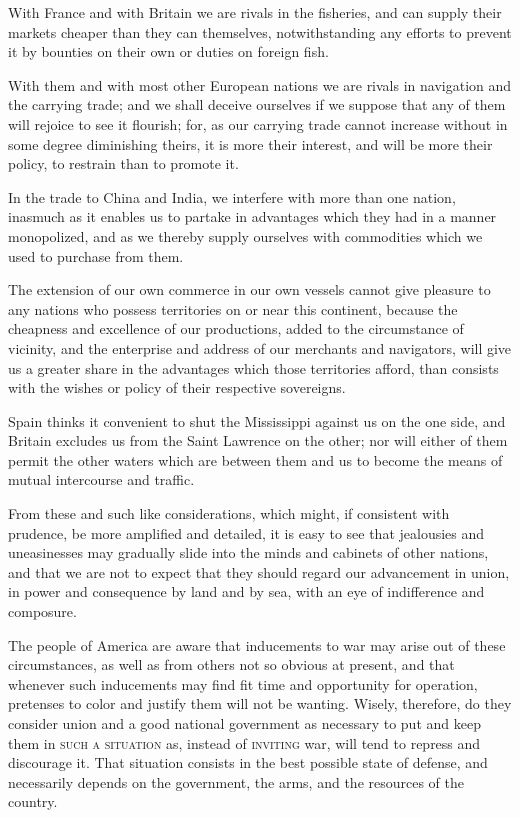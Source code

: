 With France and with Britain we are rivals in the fisheries, and can supply their markets cheaper than they can themselves, notwithstanding any efforts to prevent it by bounties on their own or duties on foreign fish.

With them and with most other European nations we are rivals in navigation and the carrying trade; and we shall deceive ourselves if we suppose that any of them will rejoice to see it flourish; for, as our carrying trade cannot increase without in some degree diminishing theirs, it is more their interest, and will be more their policy, to restrain than to promote it.

In the trade to China and India, we interfere with more than one nation, inasmuch as it enables us to partake in advantages which they had in a manner monopolized, and as we thereby supply ourselves with commodities which we used to purchase from them.

The extension of our own commerce in our own vessels cannot give pleasure to any nations who possess territories on or near this continent, because the cheapness and excellence of our productions, added to the circumstance of vicinity, and the enterprise and address of our merchants and navigators, will give us a greater share in the advantages which those territories afford, than consists with the wishes or policy of their respective sovereigns.

Spain thinks it convenient to shut the Mississippi against us on the one side, and Britain excludes us from the Saint Lawrence on the other; nor will either of them permit the other waters which are between them and us to become the means of mutual intercourse and traffic.

From these and such like considerations, which might, if consistent with prudence, be more amplified and detailed, it is easy to see that jealousies and uneasinesses may gradually slide into the minds and cabinets of other nations, and that we are not to expect that they should regard our advancement in union, in power and consequence by land and by sea, with an eye of indifference and composure.

The people of America are aware that inducements to war may arise out of these circumstances, as well as from others not so obvious at present, and that whenever such inducements may find fit time and opportunity for operation, pretenses to color and justify them will not be wanting. 
Wisely, therefore, do they consider union and a good national government as necessary to put and keep them in \textsc{such a situation} as, instead of \textsc{inviting} war, will tend to repress and discourage it. 
That situation consists in the best possible state of defense, and necessarily depends on the government, the arms, and the resources of the country.

